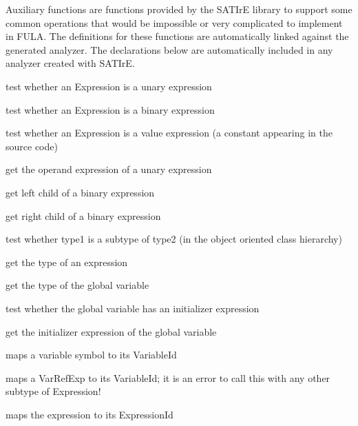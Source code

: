 \documentclass[a4paper,12pt]{report}
\begin{document}
Auxiliary functions are functions provided by the SATIrE library to support
some common operations that would be impossible or very complicated to
implement in FULA. The definitions for these functions are automatically
linked against the generated analyzer. The declarations below are
automatically included in any analyzer created with SATIrE.

\begin{description}
    test whether an Expression is a unary expression

    test whether an Expression is a binary expression

    test whether an Expression is a value expression (a constant appearing
    in the source code)

    get the operand expression of a unary expression

    get left child of a binary expression

    get right child of a binary expression

    test whether type1 is a subtype of type2 (in the object oriented class
    hierarchy)

    get the type of an expression

    get the type of the global variable

    test whether the global variable has an initializer expression

    get the initializer expression of the global variable

    maps a variable symbol to its VariableId

    maps a VarRefExp to its VariableId; it is an error to call this with any
    other subtype of Expression!

    maps the expression to its ExpressionId


\end{description}
\end{document}
